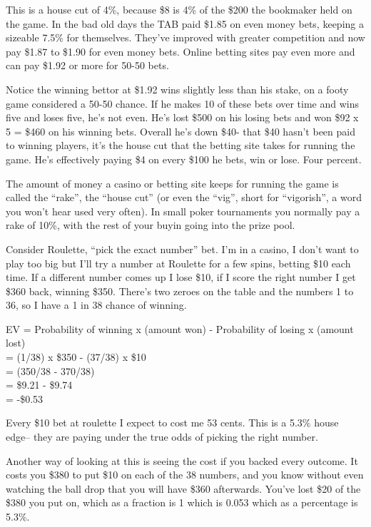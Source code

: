 This is a house cut of 4\%, because \$8 is 4\% of the \$200 the bookmaker
held on the game. In the bad old days
the TAB paid \$1.85 on even money bets, keeping a sizeable 7.5\% for
themselves. They've improved with greater competition and now pay \$1.87 to \$1.90 for
even money bets. Online betting sites pay even more and can pay
\$1.92 or more for 50-50 bets.


Notice the winning bettor at \$1.92 wins slightly less than his stake,
on a footy game considered a 50-50 chance. If he makes 10 of these
bets over time and wins five and loses five, he's not even. He's lost
\$500 on his losing bets and won \$92 x 5 = \$460 on his winning bets.
Overall he's down \$40- that \$40 hasn't been paid to winning players,
it's the house cut that the betting site takes for running the game.
He's effectively paying \$4 on every \$100 he bets, win or lose.
Four percent.

The amount of money a casino or betting site keeps for running the
game is called the ``rake'', the ``house cut'' (or even the ``vig'',
short for ``vigorish'', a word you won't hear used very often).
In small poker tournaments you normally pay a rake of 10\%, with the
rest of your buyin going into the prize pool.

Consider Roulette, ``pick the exact number'' bet. I'm in a casino,
I don't want to play too big but I'll try a number at Roulette for a few
spins, betting \$10 each time. If a different number comes up I lose \$10,
if I score the right number I get \$360 back, winning \$350. There's two
zeroes on the table and the numbers 1 to 36, so I have a 1 in 38 chance of
winning.

EV = Probability of winning x (amount won) - Probability of losing x
(amount lost) \\
   = (1/38) x \$350 - (37/38) x \$10 \\
   = (350/38 - 370/38)  \\
   = \$9.21 - \$9.74 \\
   = -\$0.53

Every \$10 bet at roulette I expect to cost me 53 cents. This is a 5.3\% house
edge-- they are paying under the true odds of picking the right
number.

Another way of looking at this is seeing the cost if you backed every
outcome. It costs you \$380 to put \$10 on each of the 38 numbers, and
you know without even watching the ball drop that you will have \$360
afterwards. You've lost \$20 of the \$380 you put on, which as a
fraction is 1 which is 0.053 which as a percentage is 5.3\%.

